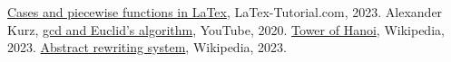 \documentclass{article}
\theoremstyle{theorem}
\theoremstyle{definition}
\theoremstyle{remark}
\begin{document}
\begin{thebibliography}{99}
 \href{https://latex-tutorial.com/piecewise-functions-latex/}{Cases and piecewise functions in LaTex}, LaTex-Tutorial.com, 2023.
 Alexander Kurz, \href{https://www.youtube.com/watch?v=ZcJMj0antos}{gcd and Euclid's algorithm}, YouTube, 2020.
 \href{https://en.wikipedia.org/wiki/Tower_of_Hanoi}{Tower of Hanoi}, Wikipedia, 2023.
\href{https://en.wikipedia.org/wiki/Abstract_rewriting_system#:~:text=In%20a%20convergent%20ARS%2C%20every,if%20it%20is%20locally%20confluent.}{Abstract rewriting system}, Wikipedia, 2023.
\end{thebibliography}
\end{document}
